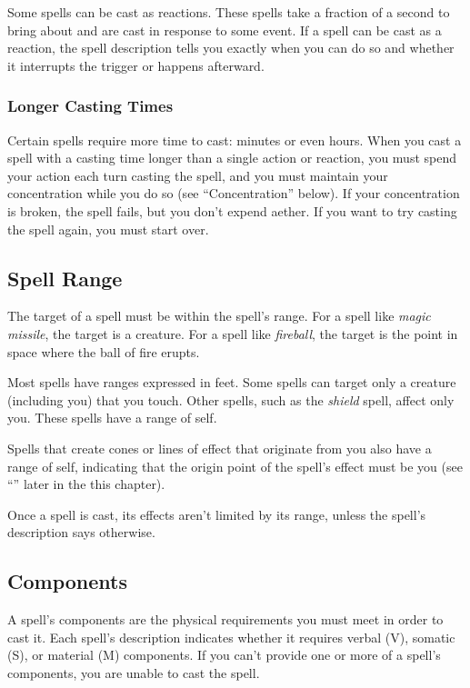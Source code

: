 Some spells can be cast as reactions. These spells take a fraction of a second to bring about and are cast in response to some event. If a spell can be cast as a reaction, the spell description tells you exactly when you can do so and whether it interrupts the trigger or happens afterward.

\subsubsection{Longer Casting Times}

Certain spells require more time to cast: minutes or even hours. When you cast a spell with a casting time longer than a single action or reaction, you must spend your action each turn casting the spell, and you must maintain your concentration while you do so (see “Concentration” below). If your concentration is broken, the spell fails, but you don't expend aether. If you want to try casting the spell again, you must start over.

\subsection{Spell Range}

The target of a spell must be within the spell's range. For a spell like \textit{magic missile}, the target is a creature. For a spell like \textit{fireball}, the target is the point in space where the ball of fire erupts.

Most spells have ranges expressed in feet. Some spells can target only a creature (including you) that you touch. Other spells, such as the \textit{shield} spell, affect only you. These spells have a range of self.

Spells that create cones or lines of effect that originate from you also have a range of self, indicating that the origin point of the spell's effect must be you (see “” later in the this chapter).

Once a spell is cast, its effects aren't limited by its range, unless the spell's description says otherwise.

\subsection{Components}

A spell's components are the physical requirements you must meet in order to cast it. Each spell's description indicates whether it requires verbal (V), somatic (S), or material (M) components. If you can't provide one or more of a spell's components, you are unable to cast the spell.

